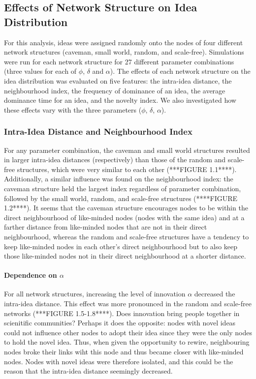 

\subsection{Effects of Network Structure on Idea Distribution}

For this analysis, ideas were assigned randomly onto the nodes of four different network structures (caveman, small world, random, and scale-free). Simulations were run for each network structure for 27 different parameter combinations (three values for each of $\phi$, $\delta$ and $\alpha$). The effects of each network structure on the idea distribution was evaluated on five features: the intra-idea distance, the neighbourhood index, the frequency of dominance of an idea, the average dominance time for an idea, and the novelty index. We also investigated how these effects vary with the three parameters ($\phi$, $\delta$, $\alpha$).

\subsubsection{Intra-Idea Distance and Neighbourhood Index}

For any parameter combination, the caveman and small world structures resulted in larger intra-idea distances (respectively) than those of the random and scale-free structures, which were very similar to each other (***FIGURE 1.1****). Additionally, a similar influence was found on the neighbourhood index: the caveman structure held the largest index regardless of parameter combination, followed by the small world, random, and scale-free structures (****FIGURE 1.2****). It seems that the caveman structure encourages nodes to be within the direct neighbourhood of like-minded nodes (nodes with the same idea) and at a farther distance from like-minded nodes that are not in their direct neighbourhood, whereas the random and scale-free structures have a tendency to keep like-minded nodes in each other's direct neighbourhood but to also keep those like-minded nodes not in their direct neighbourhood at a shorter distance.

\paragraph{Dependence on $\alpha$}
For all network structures, increasing the level of innovation $\alpha$ decreased the intra-idea distance. This effect was more pronounced in the random and scale-free networks (***FIGURE 1.5-1.8****). Does innovation bring people together in scienitific communities? Perhaps it does the opposite: nodes with novel ideas could not influence other nodes to adopt their idea since they were the only nodes to hold the novel idea. Thus, when given the opportunity to rewire, neighbouring nodes broke their links wiht this node and thus became closer with like-minded nodes. Nodes with novel ideas were therefore isolated, and this could be the reason that the intra-idea distance seemingly decreased.

